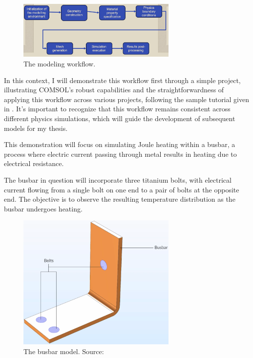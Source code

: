\begin{figure}[H]
  \centering
  \includegraphics[width=0.7\textwidth]{Chapters/Figures/Chapter 3 Figures/COMSOL Modelling Workflow.png}
  \caption{The modeling workflow.}
  \label{fig:The modeling workflow.}
\end{figure}

In this context, I will demonstrate this workflow first through a simple project, illustrating COMSOL's robust capabilities and the straightforwardness of applying this workflow across various projects, following the sample tutorial given in \cite{multiphysics__modeling_nodate}. It's important to recognize that this workflow remains consistent across different physics simulations, which will guide the development of subsequent models for my thesis.

This demonstration will focus on simulating Joule heating within a busbar, a process where electric current passing through metal results in heating due to electrical resistance.

The busbar in question will incorporate three titanium bolts, with electrical current flowing from a single bolt on one end to a pair of bolts at the opposite end. The objective is to observe the resulting temperature distribution as the busbar undergoes heating.

\begin{figure}[H]
  \centering
  \includegraphics[width=0.7\textwidth]{Chapters/Figures/Chapter 3 Figures/Busbar.png}
  \caption{The busbar model. Source: \cite{multiphysics__modeling_nodate}}
  \label{fig:The busbar model}
\end{figure}

